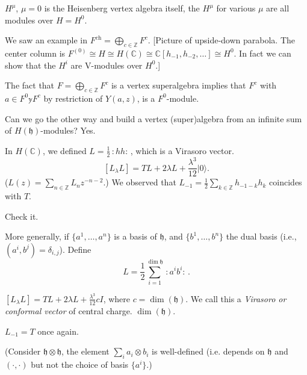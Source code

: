 $H^\mu$, $\mu=0$ is the Heisenberg vertex algebra itself,
the $H^\mu$ for various $\mu$ are all modules over $H=H^0$.

We saw an example in $F^{\text{ch}}=\bigoplus_{c \in \mathbb{Z}}F^c$.
[Picture of upside-down parabola.
The center column is
 $F^{(0)}\cong H \cong H(\mathbb{C})\cong \mathbb{C}[h_{-1},h_{-2},\ldots] 
\cong H^0$.
In fact we can show that the $H^i$ are V-modules 
over $H^0$.]

\begin{remark}
\label{remark-super}
The fact that $F= \bigoplus_{c \in \mathbb{Z}}F^c$ is
a vertex superalgebra implies that $F^c$ with $a \in F^0 \mathbb{y} F^c$
by restriction of $Y(a,z)$, is a $F^0$-module.
\end{remark}

\noindent
Can we go the other way and build a vertex
(super)algebra from an infinite sum of $H(\mathfrak{h})$-modules? Yes.

\begin{remark}[Technical]
\label{remark-technical}
In $H(\mathbb{C})$, we defined $L=\frac{1}{2}\,:\!hh\!:\,$,
which is a Virasoro vector.
$$
[L_\lambda L]=TL+2\lambda L +\frac{\lambda^3}{12}|0\rangle.
$$
($L(z)=\sum_{n \in \mathbb{Z}}L_nz^{-n-2}$.)
We observed that $L_{-1}=\frac{1}{2}\sum_{k \in \mathbb{Z}}h_{-1-k}h_k$ 
coincides with $T$.
\end{remark}

\begin{exercise}
\label{exercise-check-it}
Check it.
\end{exercise}

\noindent
More generally, if $\{a^1,\ldots,a^n\}$ is a basis of $\mathfrak{h}$,
and $\{b^1,\ldots,b^n\}$ the dual basis
(i.e., $(a^i,b^j)=\delta_{i,j}$).
Define
$$
L=\frac{1}{2}\sum_{i=1}^{\dim \mathfrak{h}}\,:\!a^ib^i\!:\,.
$$

\begin{exercise}
\label{exercise-virasoro-vector}
$[L_\lambda L]=TL+2\lambda L+\frac{\lambda^3}{12}cI$,
where $c=\dim(\mathfrak{h})$. We call this
a {\it Virasoro or conformal vector} of central charge.
$\dim (\mathfrak{h})$.
\end{exercise}

\begin{exercise}
\label{exercise-once-again}
$L_{-1}=T$ once again.
\end{exercise}

\noindent
(Consider $\mathfrak{h} \otimes \mathfrak{h}$, the element
$\sum_i a_i \otimes b_i$ is well-defined
(i.e. depends on $\mathfrak{h}$ and $(\cdot,\cdot)$ 
but not the choice of basis $\{a^i\}$.)

